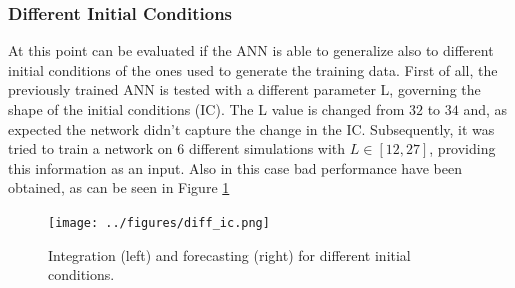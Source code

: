 \documentclass[]{article}
\begin{document}
\subsubsection{Different Initial Conditions}
At this point can be evaluated if the ANN is able to generalize also to different initial conditions of the ones used to generate the training data. First of all, the previously trained ANN is tested with a different parameter L, governing the shape of the initial conditions (IC). The L value is changed from $32$ to $34$ and, as expected the network didn't capture the change in the IC. Subsequently, it was tried to train a network on $6$ different simulations with $L \in [12, 27]$, providing this information as an input. Also in this case bad performance have been obtained, as can be seen in Figure \ref{fig:fig9}
\begin{figure}[!b]
	\centering
	\texttt{[image: ../figures/diff\_ic.png]}
	\caption{Integration (left) and forecasting (right) for different initial conditions.}
	\label{fig:fig9}
\end{figure}
\end{document}
